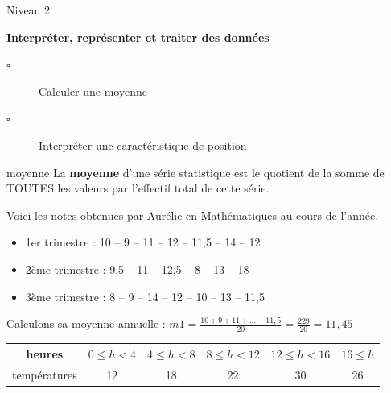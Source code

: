 \begin{titre}

{\color{bleu3}{\LARGE Calcul de moyenne} \hfill{Niveau 2}}
\end{titre}



\begin{CpsCol}
\textbf{Interpréter, représenter et traiter des données}
\begin{description}
\item[$\square$] Calculer une moyenne
\item[$\square$] Interpréter une caractéristique de position
\end{description}
\end{CpsCol}

\begin{Rec}

\end{Rec}

\begin{DefT}{moyenne}
La \textbf{moyenne} d'une série statistique est le quotient de la somme de TOUTES les valeurs par l'effectif total de cette série.
\end{DefT}

\begin{Ex}
Voici les notes obtenues par Aurélie en Mathématiques au cours de l'année. 
\begin{itemize}
\item	1er trimestre :		10 – 9 – 11 – 12 – 11,5 – 14 – 12
\item	2ème trimestre :	9,5 – 11 – 12,5 – 8 – 13 – 18
\item	3ème trimestre :	8 – 9 – 14 – 12 – 10 – 13 – 11,5
\end{itemize}
Calculons sa moyenne annuelle :
		$m1 =\frac{10+9+11+\ldots{}+11,5}{20}=\frac{229}{20}=11,45$ 
\end{Ex}
		

\begin{AD}

\end{AD}


 


\begin{tabular}{|c|c|c|c|c|c|}
\hline 
heures & $0\leq h < 4$ & $4 \leq h < 8$ & $8 \leq h < 12$ & $12 \leq h < 16$ & $16 \leq h$ \\ 
\hline 
températures & 12 & 18 & 22 & 30 & 26 \\ 
\hline 
\end{tabular} 



